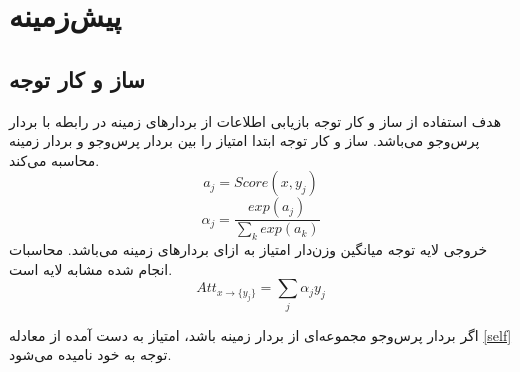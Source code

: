 
\chapter{پیش‌زمینه}
\thispagestyle{empty}

\section{ساز و کار توجه
}\label{attention}
هدف استفاده از ساز و کار توجه
بازیابی اطلاعات از بردارهای زمینه
در رابطه با بردار پرس‌وجو
می‌باشد. ساز و کار توجه ابتدا امتیاز 
را بین بردار پرس‌وجو 
و بردار زمینه
محاسبه می‌کند.
\begin{equation}
	a_j = Score(x, y_j)
\end{equation}
\begin{equation}
	\alpha_j = \frac{exp(a_j)}{\sum_{k} exp(a_k)}
\end{equation}
خروجی لایه توجه میانگین وزن‌دار امتیاز 
به ازای بردار‌های زمینه می‌باشد. محاسبات انجام شده مشابه لایه 
است.
\begin{equation}\label{self}
	Att_{x \to \{y_j\}} = \sum_{j} \alpha_jy_j
\end{equation}


اگر بردار پرس‌وجو
مجموعه‌ای از بردار زمینه
باشد، امتیاز به دست آمده از معادله
\ref{self}
 توجه به خود
  نامیده می‌شود.




